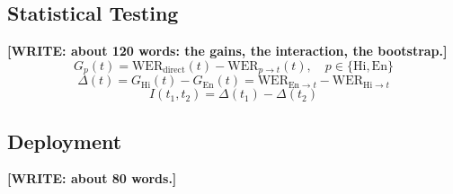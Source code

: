 \documentclass[conference]{IEEEtran}
\newcommand{\WRITE}[1]{{\color{red}\textbf{[WRITE: #1]}}}
\begin{document}
\subsection{Statistical Testing}

\WRITE{about 120 words: the gains, the interaction, the bootstrap.}
\begin{equation}
G_p(t) = \mathrm{WER}_{\mathrm{direct}}(t) - \mathrm{WER}_{p \rightarrow t}(t), \quad p \in \{\mathrm{Hi}, \mathrm{En}\}
\label{eq:gain}
\end{equation}
\begin{equation}
\Delta(t) = G_{\mathrm{Hi}}(t) - G_{\mathrm{En}}(t) = \mathrm{WER}_{\mathrm{En} \rightarrow t} - \mathrm{WER}_{\mathrm{Hi} \rightarrow t}
\label{eq:delta}
\end{equation}
\begin{equation}
I(t_1, t_2) = \Delta(t_1) - \Delta(t_2)
\label{eq:interaction}
\end{equation}

\subsection{Deployment}

\WRITE{about 80 words.}
\end{document}
